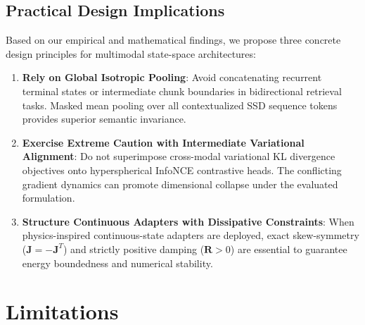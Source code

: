 \documentclass[10pt,journal,final]{IEEEtran}
\begin{document}
\subsection{Practical Design Implications}
Based on our empirical and mathematical findings, we propose three concrete design principles for multimodal state-space architectures:
\begin{enumerate}
    \item \textbf{Rely on Global Isotropic Pooling}: Avoid concatenating recurrent terminal states or intermediate chunk boundaries in bidirectional retrieval tasks. Masked mean pooling over all contextualized SSD sequence tokens provides superior semantic invariance.
    \item \textbf{Exercise Extreme Caution with Intermediate Variational Alignment}: Do not superimpose cross-modal variational KL divergence objectives onto hyperspherical InfoNCE contrastive heads. The conflicting gradient dynamics can promote dimensional collapse under the evaluated formulation.
    \item \textbf{Structure Continuous Adapters with Dissipative Constraints}: When physics-inspired continuous-state adapters are deployed, exact skew-symmetry ($\mathbf{J} = -\mathbf{J}^T$) and strictly positive damping ($\mathbf{R} > 0$) are essential to guarantee energy boundedness and numerical stability.
\end{enumerate}

\section{Limitations}
\label{sec:limitations}
\end{document}
